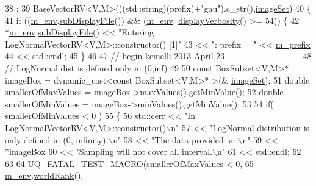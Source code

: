 \begin{DoxyCode}
38   :
39   BaseVectorRV<V,M>(((std::string)(prefix)+\textcolor{stringliteral}{"gau"}).c\_str(),\hyperlink{class_q_u_e_s_o_1_1_base_vector_r_v_aa4dd2f036228eac1f945bacc7147a922}{imageSet})
40 \{
41   \textcolor{keywordflow}{if} ((\hyperlink{class_q_u_e_s_o_1_1_base_vector_r_v_a556761c50e2d171977ef5f19a63c8c73}{m\_env}.\hyperlink{class_q_u_e_s_o_1_1_base_environment_a8a0064746ae8dddfece4229b9ad374d6}{subDisplayFile}()) && (\hyperlink{class_q_u_e_s_o_1_1_base_vector_r_v_a556761c50e2d171977ef5f19a63c8c73}{m\_env}.
      \hyperlink{class_q_u_e_s_o_1_1_base_environment_a1fe5f244fc0316a0ab3e37463f108b96}{displayVerbosity}() >= 54)) \{
42     *\hyperlink{class_q_u_e_s_o_1_1_base_vector_r_v_a556761c50e2d171977ef5f19a63c8c73}{m\_env}.\hyperlink{class_q_u_e_s_o_1_1_base_environment_a8a0064746ae8dddfece4229b9ad374d6}{subDisplayFile}() << \textcolor{stringliteral}{"Entering LogNormalVectorRV<V,M>::constructor() [1]"}
43                             << \textcolor{stringliteral}{": prefix = "} << \hyperlink{class_q_u_e_s_o_1_1_base_vector_r_v_a030ce3bc9873a9eaf6d8bf452c096ab3}{m\_prefix}
44                             << std::endl;
45   \}
46 
47 \textcolor{comment}{// begin kemelli 2013-April-23 -------------------------- }
48 \textcolor{comment}{// LogNormal dist is defined only in (0,inf)}
49 
50   \textcolor{keyword}{const} BoxSubset<V,M>* imageBox = \textcolor{keyword}{dynamic\_cast<}\textcolor{keyword}{const }BoxSubset<V,M>* \textcolor{keyword}{>}(&
      \hyperlink{class_q_u_e_s_o_1_1_base_vector_r_v_aa4dd2f036228eac1f945bacc7147a922}{imageSet});
51   \textcolor{keywordtype}{double} smallerOfMaxValues = imageBox->maxValues().getMinValue();      
52   \textcolor{keywordtype}{double} smallerOfMinValues = imageBox->minValues().getMinValue();
53     
54  \textcolor{keywordflow}{if}( smallerOfMinValues < 0 ) 
55  \{              
56    std::cerr << \textcolor{stringliteral}{"In LogNormalVectorRV<V,M>::constructor()\(\backslash\)n"} 
57        << \textcolor{stringliteral}{"LogNormal distribution is only defined in (0, infinity).\(\backslash\)n"}
58        << \textcolor{stringliteral}{"The data provided is: \(\backslash\)n"}
59        << *imageBox 
60          << \textcolor{stringliteral}{"Sampling will not cover all interval.\(\backslash\)n"}   
61          << std::endl;
62 
63 
64     \hyperlink{_defines_8h_a56d63d18d0a6d45757de47fcc06f574d}{UQ\_FATAL\_TEST\_MACRO}(smallerOfMaxValues < 0,
65                       \hyperlink{class_q_u_e_s_o_1_1_base_vector_r_v_a556761c50e2d171977ef5f19a63c8c73}{m\_env}.\hyperlink{class_q_u_e_s_o_1_1_base_environment_a78b57112bbd0e6dd0e8afec00b40ffa7}{worldRank}(),

\end{DoxyCode}
